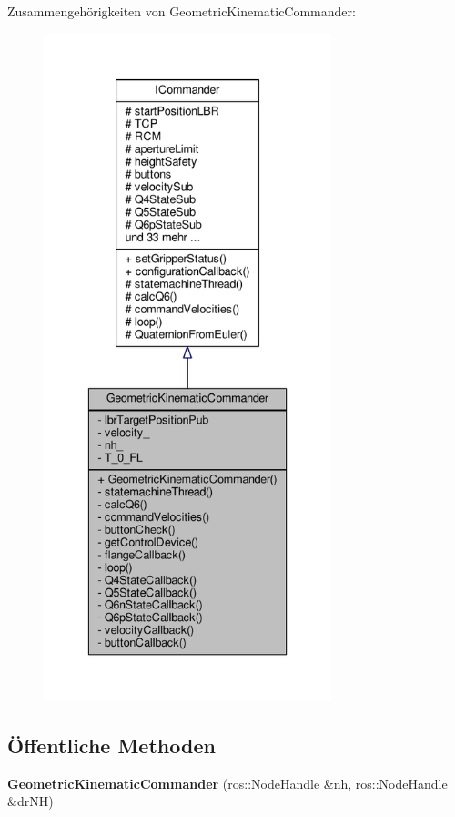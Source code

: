 Zusammengehörigkeiten von Geometric\-Kinematic\-Commander\-:
\nopagebreak
\begin{figure}[H]
\begin{center}
\leavevmode
\includegraphics[height=550pt]{classGeometricKinematicCommander__coll__graph}
\end{center}
\end{figure}
\subsection*{Öffentliche Methoden}
\begin{DoxyCompactItemize}
\item 
\hypertarget{classGeometricKinematicCommander_a7bb3cf43a3e4f09f71433f11af17dfcc}{{\bfseries Geometric\-Kinematic\-Commander} (ros\-::\-Node\-Handle \&nh, ros\-::\-Node\-Handle \&dr\-N\-H)}\label{classGeometricKinematicCommander_a7bb3cf43a3e4f09f71433f11af17dfcc}

\end{DoxyCompactItemize}
